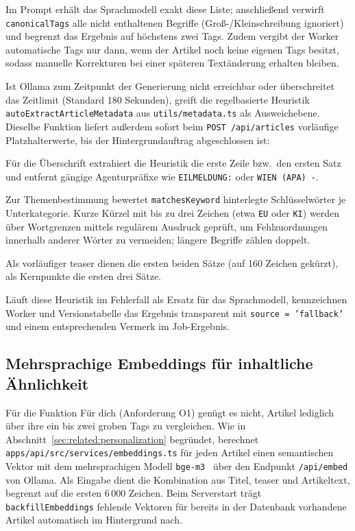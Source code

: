 Im Prompt erhält das Sprachmodell exakt diese Liste; anschließend verwirft \texttt{canonicalTags} alle nicht enthaltenen Begriffe (Groß-/Kleinschreibung ignoriert) und begrenzt das Ergebnis auf höchstens zwei Tags.
Zudem vergibt der Worker automatische Tags nur dann, wenn der Artikel noch keine eigenen Tags besitzt, sodass manuelle Korrekturen bei einer späteren Textänderung erhalten bleiben.

Ist Ollama zum Zeitpunkt der Generierung nicht erreichbar oder überschreitet das Zeitlimit (Standard 180 Sekunden), greift die regelbasierte Heuristik \texttt{autoExtractArticleMetadata} aus \texttt{utils/metadata.ts} als Ausweichebene.
Dieselbe Funktion liefert außerdem sofort beim \texttt{POST /api/articles} vorläufige Platzhalterwerte, bis der Hintergrundauftrag abgeschlossen ist:
\begin{compactenum}
    \item Für die Überschrift extrahiert die Heuristik die erste Zeile bzw.\ den ersten Satz und entfernt gängige Agenturpräfixe wie \texttt{EILMELDUNG:} oder \texttt{WIEN (APA) -}.
    \item Zur Themenbestimmung bewertet \texttt{matchesKeyword} hinterlegte Schlüsselwörter je Unterkategorie. Kurze Kürzel mit bis zu drei Zeichen (etwa \texttt{EU} oder \texttt{KI}) werden über Wortgrenzen mittels regulärem Ausdruck geprüft, um Fehlzuordnungen innerhalb anderer Wörter zu vermeiden; längere Begriffe zählen doppelt.
    \item Als vorläufiger \gls{teaser} dienen die ersten beiden Sätze (auf 160 Zeichen gekürzt), als Kernpunkte die ersten drei Sätze.
\end{compactenum}
Läuft diese Heuristik im Fehlerfall als Ersatz für das Sprachmodell, kennzeichnen Worker und Versionstabelle das Ergebnis transparent mit \texttt{source = 'fallback'} und einem entsprechenden Vermerk im Job-Ergebnis.

\subsection{Mehrsprachige Embeddings für inhaltliche Ähnlichkeit}

Für die Funktion \glqq Für dich\grqq{} (Anforderung O1) genügt es nicht, Artikel lediglich über ihre ein bis zwei groben Tags zu vergleichen.
Wie in Abschnitt~\ref{sec:related:personalization} begründet, berechnet \texttt{apps/api/src/services/embeddings.ts} für jeden Artikel einen semantischen Vektor mit dem mehrsprachigen Modell \texttt{bge-m3}~\cite{chen2024bgem3} über den Endpunkt \texttt{/api/embed} von Ollama.
Als Eingabe dient die Kombination aus Titel, \gls{teaser} und Artikeltext, begrenzt auf die ersten 6\,000 Zeichen.
Beim Serverstart trägt \texttt{backfillEmbeddings} fehlende Vektoren für bereits in der Datenbank vorhandene Artikel automatisch im Hintergrund nach.

